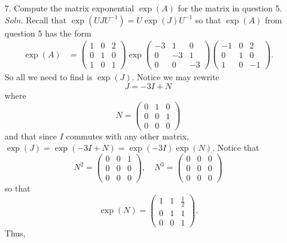 \documentclass{article}
\begin{document}
\begin{itemize}
    \item[7.] Compute the matrix exponential $\exp(A)$ for the matrix in question 5.
    \newline\newline
    \textit{Soln.} Recall that $\exp(UJU^{-1}) = U\exp(J)U^{-1}$ so that $\exp(A)$ from question 5 has the form
    \begin{align*}
        \exp(A) &= \begin{pmatrix}
            1 & 0 & 2\\
            0 & 1 & 0\\
            1 & 0 & 1
        \end{pmatrix}\exp\begin{pmatrix}
            -3 & 1 & 0\\
            0 & -3 & 1\\
            0 & 0 & -3
        \end{pmatrix}\begin{pmatrix}
            -1 & 0 & 2\\
            0 & 1 & 0\\
            1 & 0 & -1
        \end{pmatrix}.
    \end{align*}
    So all we need to find is $\exp(J)$. Notice we may rewrite
    \[J = -3I + N\]
    where 
    \[N = \begin{pmatrix}
        0 & 1 & 0\\
        0 & 0 & 1\\
        0 & 0 & 0
    \end{pmatrix}\]
    and that since $I$ commutes with any other matrix, $\exp(J) = \exp(-3I + N) = \exp(-3I)\exp(N)$. Notice that 
    \[N^2 = \begin{pmatrix}
        0 & 0 & 1\\
        0 & 0 & 0\\
        0 & 0 & 0
    \end{pmatrix}, \hspace{1em} N^3 = \begin{pmatrix}
        0 & 0 & 0\\
        0 & 0 & 0\\
        0 & 0 & 0
    \end{pmatrix}\]
    so that 
    \[\exp(N) = \begin{pmatrix}
        1 & 1 & \frac{1}{2}\\
        0 & 1 & 1\\
        0 & 0 & 1
    \end{pmatrix}.\] Thus,

\end{itemize}
\end{document}
